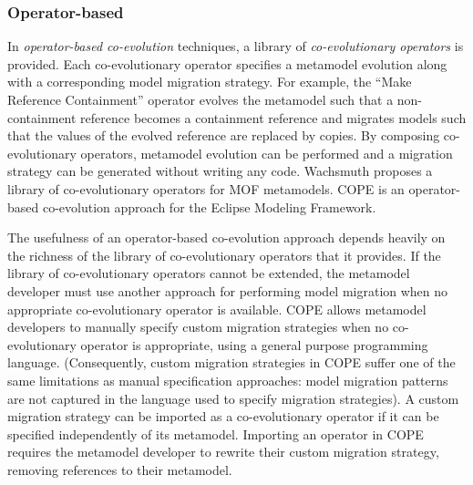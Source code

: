 \subsubsection{Operator-based}
\label{subsec:operator-based_co-evolution}
In \emph{operator-based co-evolution} techniques, a library of \emph{co-evolutionary operators} is provided. Each co-evolutionary operator specifies a metamodel evolution along with a corresponding model migration strategy. For example, the ``Make Reference Containment'' operator evolves the metamodel such that a non-containment reference becomes a containment reference and migrates models such that the values of the evolved reference are replaced by copies. By composing co-evolutionary operators, metamodel evolution can be performed and a migration strategy can be generated without writing any code. Wachsmuth \cite{wachsmuth07metamodel} proposes a library of co-evolutionary operators for MOF metamodels. COPE \cite{herrmannsdoerfer09cope} is an operator-based co-evolution approach for the Eclipse Modeling Framework.

The usefulness of an operator-based co-evolution approach depends heavily on the richness of the library of co-evolutionary operators that it provides. If the library of co-evolutionary operators cannot be extended, the metamodel developer must use another approach for performing model migration when no appropriate co-evolutionary operator is available. COPE allows metamodel developers to manually specify custom migration strategies when no co-evolutionary operator is appropriate, using a general purpose programming language. (Consequently, custom migration strategies in COPE suffer one of the same limitations as manual specification approaches: model migration patterns are not captured in the language used to specify migration strategies). A custom migration strategy can be imported as a co-evolutionary operator if it can be specified independently of its metamodel. Importing an operator in COPE requires the metamodel developer to rewrite their custom migration strategy, removing references to their metamodel.

